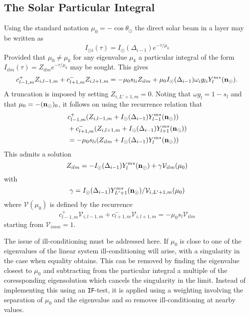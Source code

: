 \subsection{The Solar Particular Integral}

Using the standard notation $\mu_0 = - \cos \theta_\odot$ the direct solar beam
in a layer may be written as
\begin{equation}
I_{\odot i}(\tau) = I_\odot (\Delta_{i-1}) e^{-\tau/\mu_0}
\end{equation}
Provided that $\mu_0 \neq \mu_k$ for any eigenvalue $\mu_k$ a particular 
integral of the form $I_{ilm}(\tau)=Z_{ilm} e^{-\tau/\mu_0}$ may be sought.
This gives
\begin{equation}
c_{l-1,m}^+ Z_{i,l-1,m} + c_{l+1,m}^- Z_{i,l+1,m}
= -\mu_0 s_{li} Z_{ilm} +\mu_0 I_\odot (\Delta_{i-1})
\omega_i g_{li} Y_l^{m*} ( \mathbf{n}_\odot).
\end{equation}
A truncation is imposed by setting $Z_{i,L'+1,m}=0$. Noting that $\omega g_l
=1-s_l$ and that $\mu_0 = -(\mathbf{n}_\odot)_0$, it follows on using the
recurrence relation that
\begin{equation}
\begin{split}
&c_{l-1,m}^+ (Z_{i,l-1,m} + I_\odot (\Delta_{i-1}) Y_{l-1}^{m*} ( \mathbf{n}_\odot))
\\
&+ c_{l+1,m}^- (Z_{i,l+1,m}+ I_\odot (\Delta_{i-1}) Y_{l+1}^{m*}( \mathbf{n}_\odot))
\\
&= -\mu_0 s_{li} (Z_{ilm} +I_\odot (\Delta_{i-1}) Y_l^{m*} ( \mathbf{n}_\odot))
\end{split}
\end{equation}
This admits a solution
\begin{equation}
Z_{ilm} = - I_\odot (\Delta_{i-1}) Y_l^{m*} (\mathbf{n}_\odot) 
+ \gamma \mathcal{V}_{ilm}(\mu_0)
\end{equation}
with
\begin{equation}
\gamma= I_\odot (\Delta_{i-1}) Y_{L'+1}^{m*} ( \mathbf{n}_\odot)/ 
\mathcal{V}_{i,L'+1,m} (\mu_0)
\end{equation}
where $\mathcal{V}(\mu_0)$ is defined by the recurrence
\begin{equation}
c_{l-1,m}^+ \mathcal{V}_{i,l-1,m} + c_{l+1,m}^- \mathcal{V}_{i,l+1,m} 
= - \mu_0 s_l \mathcal{V}_{ilm}
\end{equation}
starting from $\mathcal{V}_{imm}=1$.

The issue of ill-conditioning must be addressed here. If $\mu_0$ is close
to one of the eigenvalues of the linear system ill-conditioning will
arise, with a singularity in the case when equality obtains. This can be 
removed by finding the eigenvalue closest to $\mu_0$ and subtracting from the 
particular integral a multiple of the coressponding eigensolution which
cancels the singularity in the limit. Instead of implementing this using
an {\tt IF}-test, it is applied using a weighting involving the separation
of $\mu_0$ and the eigenvalue and so removes ill-conditioning at nearby values.

